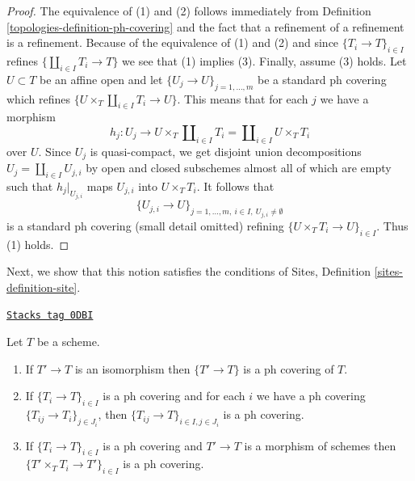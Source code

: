 \begin{proof}

The equivalence of (1) and (2) follows immediately from
Definition \ref{topologies-definition-ph-covering}
and the fact that a refinement of a refinement is a refinement.
Because of the equivalence of (1) and (2) and since
$\{T_i \to T\}_{i \in I}$ refines $\{\coprod_{i \in I} T_i \to T\}$
we see that (1) implies (3). Finally, assume (3) holds.
Let $U \subset T$ be an affine open and let
$\{U_j \to U\}_{j = 1, \ldots, m}$ be a standard ph covering
which refines $\{U \times_T \coprod_{i \in I} T_i \to U\}$.
This means that for each $j$ we have a morphism
$$
h_j :
U_j
\longrightarrow
U \times_T \coprod\nolimits_{i \in I} T_i =
\coprod\nolimits_{i \in I} U \times_T T_i
$$
over $U$. Since $U_j$ is quasi-compact, we get
disjoint union decompositions $U_j = \coprod_{i \in I} U_{j, i}$
by open and closed subschemes almost all of which are empty
such that $h_j|_{U_{j, i}}$ maps $U_{j, i}$ into $U \times_T T_i$.
It follows that
$$
\{U_{j, i} \to U\}_{j = 1, \ldots, m,\ i \in I,\ U_{j, i} \not = \emptyset}
$$
is a standard ph covering (small detail omitted) refining
$\{U \times_T T_i \to U\}_{i \in I}$. Thus (1) holds.
\end{proof}

Next, we show that this notion satisfies the conditions of
Sites, Definition \ref{sites-definition-site}.

\begin{lemma}[Ph]
\label{topologies-lemma-ph}
\href{https://stacks.math.columbia.edu/tag/0DBI}{\texttt{Stacks tag 0DBI}}

Let $T$ be a scheme.
\begin{enumerate}
\item If $T' \to T$ is an isomorphism then $\{T' \to T\}$
is a ph covering of $T$.
\item If $\{T_i \to T\}_{i\in I}$ is a ph covering and for each
$i$ we have a ph covering $\{T_{ij} \to T_i\}_{j\in J_i}$, then
$\{T_{ij} \to T\}_{i \in I, j\in J_i}$ is a ph covering.
\item If $\{T_i \to T\}_{i\in I}$ is a ph covering
and $T' \to T$ is a morphism of schemes then
$\{T' \times_T T_i \to T'\}_{i\in I}$ is a ph covering.
\end{enumerate}
\end{lemma}

